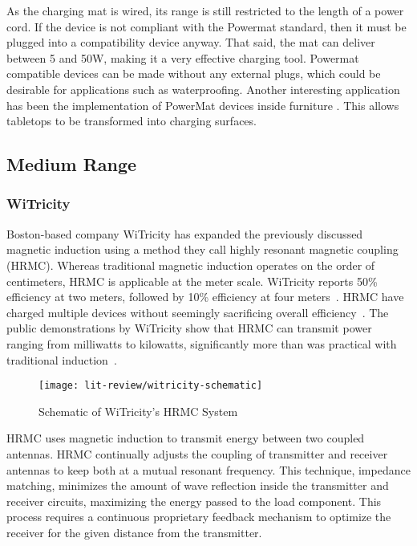 As the charging mat is wired, its range is still restricted to the length of a power cord. If the device is not compliant with the Powermat standard, then it must be plugged into a compatibility device anyway. That said, the mat can deliver between 5 and 50W, making it a very effective charging tool. Powermat compatible devices can be made without any external plugs, which could be desirable for applications such as waterproofing. Another interesting application has been the implementation of PowerMat devices inside furniture \cite{rogercheng205}. This allows tabletops to be transformed into charging surfaces. 

\subsection{Medium Range}

\subsubsection{WiTricity}
Boston-based company WiTricity has expanded the previously discussed magnetic induction using a method they call highly resonant magnetic coupling (HRMC). Whereas traditional magnetic induction operates on the order of centimeters, HRMC is applicable at the meter scale. WiTricity reports 50\% efficiency at two meters, followed by 10\% efficiency at four meters~\cite{kesler_highly_2013,tucker_contribution_2013}. HRMC have charged multiple devices without seemingly sacrificing overall efficiency~\cite{kesler_highly_2013}. The public demonstrations by WiTricity show that HRMC can transmit power ranging from milliwatts to kilowatts, significantly more than was practical with traditional induction~\cite{kesler_highly_2013}.

\begin{figure}[t]
\centering
\texttt{[image: lit-review/witricity-schematic]}
    \caption[WiTricity schematic]{Schematic of WiTricity's HRMC System~\cite{kesler_highly_2013}}
    \label{fig:lit-review-witricity-schematic}
\end{figure}

HRMC uses magnetic induction to transmit energy between two coupled antennas. HRMC continually adjusts the coupling of transmitter and receiver antennas to keep both at a mutual resonant frequency. This technique, impedance matching, minimizes the amount of wave reflection inside the transmitter and receiver circuits, maximizing the energy passed to the load component. This process requires a continuous proprietary feedback mechanism to optimize the receiver for the given distance from the transmitter.


